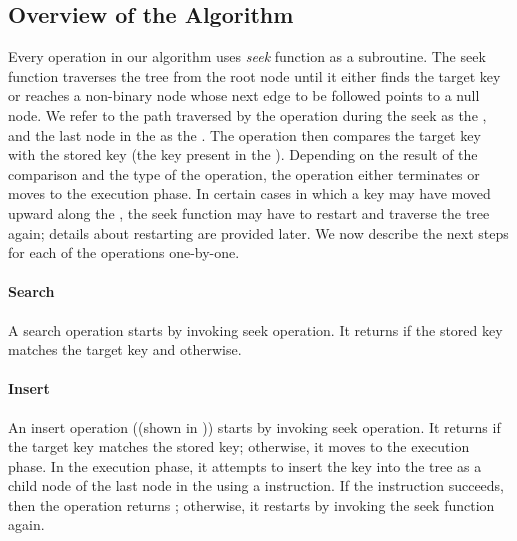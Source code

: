 \begin{limitscope}
\section{Overview of the Algorithm}

Every operation in our algorithm uses \emph{seek} function as a subroutine. The seek function traverses the  tree from the root node until it either finds the target key or reaches a non-binary node whose next edge to be followed points to a null node. We refer to the path traversed by the operation during the seek  as the \emph{\accesspath}, and the last node in the \accesspath{} as the \emph{\terminalnode}. The operation then compares the target key with the stored key (the key present in the \terminalnode). Depending on the result of the comparison and the type of the operation, the operation either terminates or moves to the execution phase. In certain cases in which a key may have moved upward along the \accesspath, the seek function may have to restart and traverse the tree again; details about restarting are provided later. We now describe the next steps for each of the operations one-by-one.

\paragraph*{Search} 
A search operation starts by invoking seek operation. It returns \true{} if the stored key matches the target key and \false{} otherwise. 

\paragraph*{Insert}

An insert operation ((shown in )) starts by invoking seek operation. It returns \false{} if the target key matches the stored key; otherwise, it moves to the execution phase. In the execution phase, it attempts to insert the key into the tree as a child node of the last node in the \accesspath{} using a \CAS{} instruction. If the instruction succeeds, then the operation returns \true{}; otherwise, it restarts by invoking the seek function again.


\end{limitscope}
